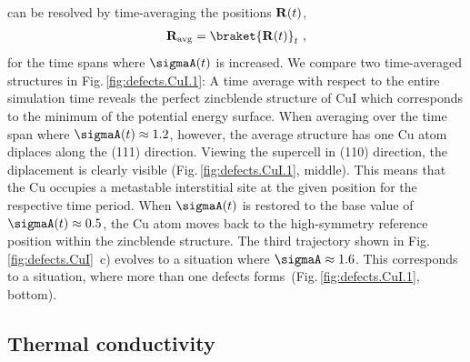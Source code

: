  can be resolved by time-averaging the positions ${\bf R} (t)$,
\begin{align}
	{\bf R}_{\rm avg} = \braket{{\bf R} (t)}_t~,	
	\label{eq:R(t).avg}
\end{align}
for the time spans where $\sigmaA (t)$ is increased. We compare two time-averaged structures in Fig.\,\ref{fig:defects.CuI.1}: A time average with respect to the entire simulation time reveals the perfect zincblende structure of CuI which corresponds to the minimum of the potential energy surface.
When averaging over the time span where $\sigmaA (t) \approx 1.2$, however, the average structure has one Cu atom diplaces along the (111) direction. Viewing the supercell in (110) direction, the diplacement is clearly visible (Fig.\,\ref{fig:defects.CuI.1}, middle). This means that the Cu occupies a metastable interstitial site at the given position for the respective time period. When $\sigmaA (t)$ is restored to the base value of $\sigmaA (t) \approx 0.5$, the Cu atom moves back to the high-symmetry reference position within the zincblende structure. 
The third trajectory shown in Fig.\,\ref{fig:defects.CuI}~c) evolves to a situation where $\sigmaA \approx 1.6$. This corresponds to a situation, where more than one defects forms~(Fig.\,\ref{fig:defects.CuI.1}, bottom).


\subsection{Thermal conductivity}

